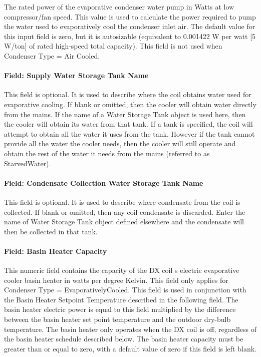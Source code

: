The rated power of the evaporative condenser water pump in Watts at low compressor/fan speed. This value is used to calculate the power required to pump the water used to evaporatively cool the condenser inlet air. The default value for this input field is zero, but it is autosizable (equivalent to 0.001422 W per watt {[}5 W/ton{]} of rated high-speed total capacity). This field is not used when Condenser Type = Air Cooled.

\paragraph{Field: Supply Water Storage Tank Name}\label{field-supply-water-storage-tank-name-1-000}

This field is optional. It is used to describe where the coil obtains water used for evaporative cooling. If blank or omitted, then the cooler will obtain water directly from the mains. If the name of a Water Storage Tank object is used here, then the cooler will obtain its water from that tank. If a tank is specified, the coil will attempt to obtain all the water it uses from the tank. However if the tank cannot provide all the water the cooler needs, then the cooler will still operate and obtain the rest of the water it needs from the mains (referred to as StarvedWater).

\paragraph{Field: Condensate Collection Water Storage Tank Name}\label{field-condensate-collection-water-storage-tank-name-3}

This field is optional. It is used to describe where condensate from the coil is collected. If blank or omitted, then any coil condensate is discarded. Enter the name of Water Storage Tank object defined elsewhere and the condensate will then be collected in that tank.

\paragraph{Field: Basin Heater Capacity}\label{field-basin-heater-capacity-1-000}

This numeric field contains the capacity of the DX coil s electric evaporative cooler basin heater in watts per degree Kelvin. This field only applies for Condenser Type = EvaporativelyCooled. This field is used in conjunction with the Basin Heater Setpoint Temperature described in the following field. The basin heater electric power is equal to this field multiplied by the difference between the basin heater set point temperature and the outdoor dry-bulb temperature. The basin heater only operates when the DX coil is off, regardless of the basin heater schedule described below. The basin heater capacity must be greater than or equal to zero, with a default value of zero if this field is left blank.

